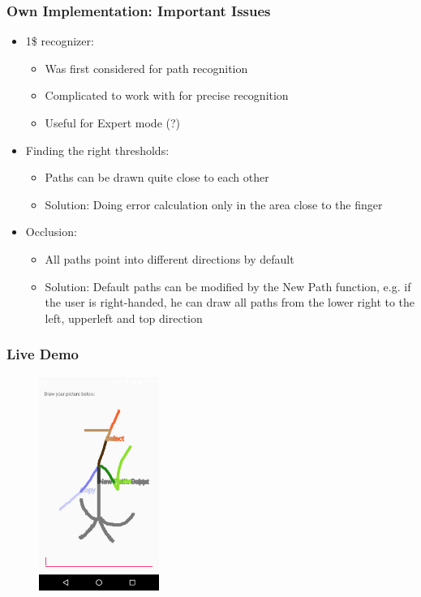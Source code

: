 \documentclass{beamer}
\begin{document}
\begin{frame}
\frametitle{Own Implementation: Important Issues}

\begin{itemize}
\item 1\$ recognizer:
	\begin{itemize}
	\item Was first considered for path recognition
	\item Complicated to work with for precise recognition
	\item Useful for Expert mode (?)\newline
	\end{itemize}
\pause
\item Finding the right thresholds:
	\begin{itemize}
	\item Paths can be drawn quite close to each other
	\item Solution: Doing error calculation only in the area close to the finger \newline
	\end{itemize}
\pause
\item Occlusion:
	\begin{itemize}
	\item All paths point into different directions by default
	\item Solution: Default paths can be modified by the \grqq New Path \grqq function, e.g. if the user is right-handed, he can draw all paths from the lower right to the left, upperleft and top direction
	\end{itemize}

\end{itemize}
\end{frame}


\begin{frame}
\frametitle{Live Demo}
\begin{figure}[H]
\centering
\includegraphics[width=0.35\textwidth]{myOctoPocus.png}
\end{figure}
\end{frame}
\end{document}
